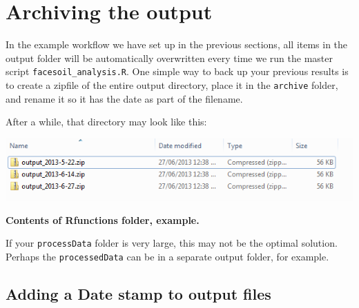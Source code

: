 \documentclass[]{book}
\newenvironment{Shaded}{\begin{snugshade}}{\end{snugshade}}
\newcommand{\CommentTok}[1]{\textcolor[rgb]{0.56,0.35,0.01}{\textit{#1}}}
\newcommand{\KeywordTok}[1]{\textcolor[rgb]{0.13,0.29,0.53}{\textbf{#1}}}
\newcommand{\NormalTok}[1]{#1}
\newcommand{\OperatorTok}[1]{\textcolor[rgb]{0.81,0.36,0.00}{\textbf{#1}}}
\newcommand{\StringTok}[1]{\textcolor[rgb]{0.31,0.60,0.02}{#1}}
\begin{document}
\begin{Shaded}
\end{Shaded}

\hypertarget{archiving-the-output}{%
\section{Archiving the output}\label{archiving-the-output}}

In the example workflow we have set up in the previous sections, all items in the output folder will be automatically overwritten every time we run the master script \texttt{facesoil\_analysis.R}. One simple way to back up your previous results is to create a zipfile of the entire output directory, place it in the \texttt{archive} folder, and rename it so it has the date as part of the filename.

After a while, that directory may look like this:

\includegraphics[width=0.7\linewidth]{screenshots/archive}

\textbf{Contents of Rfunctions folder, example.}

If your \texttt{processData} folder is very large, this may not be the optimal solution. Perhaps the \texttt{processedData} can be in a separate output folder, for example.

\hypertarget{adding-a-date-stamp-to-output-files}{%
\subsection{Adding a Date stamp to output files}\label{adding-a-date-stamp-to-output-files}}
\end{document}
